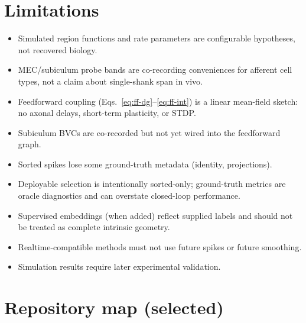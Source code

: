 \documentclass[11pt,a4paper]{article}
\begin{document}
\section{Limitations}

\begin{itemize}[leftmargin=*]
  \item Simulated region functions and rate parameters are configurable hypotheses, not recovered biology.
  \item MEC/subiculum probe bands are co-recording conveniences for afferent cell types, not a claim about single-shank span in vivo.
  \item Feedforward coupling (Eqs.~\ref{eq:ff-dg}--\ref{eq:ff-int}) is a linear mean-field sketch: no axonal delays, short-term plasticity, or STDP.
  \item Subiculum BVCs are co-recorded but not yet wired into the feedforward graph.
  \item Sorted spikes lose some ground-truth metadata (identity, projections).
  \item Deployable selection is intentionally sorted-only; ground-truth metrics are oracle diagnostics and can overstate closed-loop performance.
  \item Supervised embeddings (when added) reflect supplied labels and should not be treated as complete intrinsic geometry.
  \item Realtime-compatible methods must not use future spikes or future smoothing.
  \item Simulation results require later experimental validation.
\end{itemize}

\section{Repository map (selected)}
\end{document}
